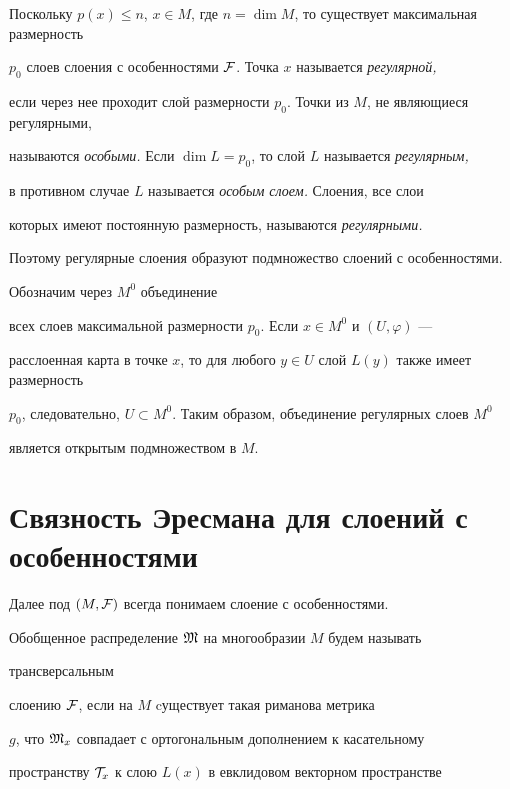 Поскольку $p(x)\le n$, $x\in M$, где $n=\dim M$, то существует максимальная размерность


$p_0$ слоев слоения с особенностями $\cal F$. Точка $x$ называется {\it регулярной,}


если через нее проходит слой размерности $p_0$. Точки из $M$, не являющиеся регулярными,


называются {\it особыми.} Если $\dim L=p_0$, то слой $L$ называется {\it регулярным,}


в противном случае $L$ называется  {\it особым слоем.} Слоения, все слои


которых имеют постоянную размерность, называются {\it регулярными.}


Поэтому регулярные слоения образуют подмножество слоений с особенностями.





Обозначим через $M^0$ объединение


всех слоев максимальной размерности $p_0$. Если $x\in M^0$ и $(U, \varphi)$ ---


расслоенная карта в точке $x$, то для любого $y\in U$ слой $L(y)$ также имеет размерность


$p_0$, следовательно, $U\subset M^0$. Таким образом, объединение регулярных слоев $M^0$


является открытым подмножеством в $M$.








\section{Связность Эресмана для слоений с особенностями}





Далее под $(M,\cal F)$ всегда понимаем слоение с особенностями.





Обобщенное распределение $\frak M$ на многообразии $M$ будем называть {\it


трансверсальным} слоению $\cal F$, если на $M$ cуществует такая риманова метрика


$g$, что ${\frak M}_x$ совпадает с ортогональным дополнением к касательному


пространству ${\cal T}_x$ к слою $L(x)$ в евклидовом векторном пространстве


